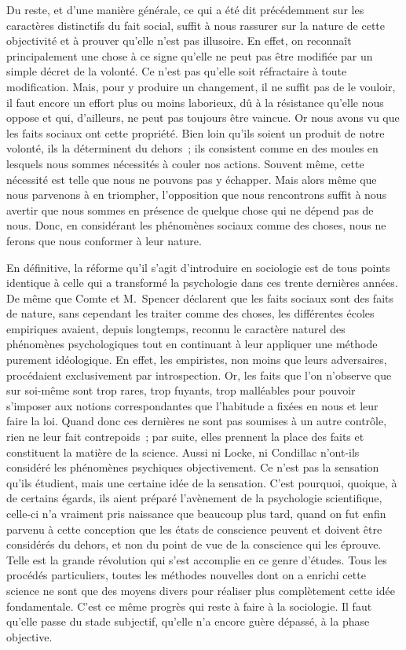 \documentclass[french,twoside]{book} %
\begin{document}
Du reste, et d’une manière générale, ce qui a été dit précédemment sur les caractères distinctifs du fait social, suffit à nous rassurer sur la nature de cette objectivité et à prouver qu’elle n’est pas illusoire. En effet, on reconnaît principalement une chose à ce signe qu’elle ne peut pas être modifiée par un simple décret de la volonté. Ce n’est pas qu’elle soit réfractaire à toute modification. Mais, pour y produire un changement, il ne suffit pas de le vouloir, il faut encore un effort plus ou moins laborieux, dû à la résistance qu’elle nous oppose et qui, d’ailleurs, ne peut pas toujours être vaincue. Or nous avons vu que les faits sociaux ont cette propriété. Bien loin qu’ils soient un produit de notre volonté, ils la déterminent du dehors ; ils consistent comme en des moules en lesquels nous sommes nécessités à couler nos actions. Souvent même, cette nécessité est telle que nous ne pouvons pas y échapper. Mais alors même que nous parvenons à en triompher, l’opposition que nous rencontrons suffit à nous avertir que nous sommes en présence de quelque chose qui ne dépend pas de nous. Donc, en considérant les phénomènes sociaux comme des choses, nous ne ferons que nous conformer à leur nature.\par
En définitive, la réforme qu’il s’agit d’introduire en sociologie est de tous points identique à celle qui a transformé la psychologie dans ces trente dernières années. De même que Comte et M. Spencer déclarent que les faits sociaux sont des faits de nature, sans cependant les traiter comme des choses, les différentes écoles empiriques avaient, depuis longtemps, reconnu le caractère naturel des phénomènes psychologiques tout en continuant à leur appliquer une méthode purement idéologique. En effet, les empiristes, non moins que leurs adversaires, procédaient exclusivement par introspection. Or, les faits que l’on n’observe que sur soi-même sont trop rares, trop fuyants, trop malléables pour pouvoir s’imposer aux notions correspondantes que l’habitude a fixées en nous et leur faire la loi. Quand donc ces dernières ne sont pas soumises à un autre contrôle, rien ne leur fait contrepoids ; par suite, elles prennent la place des faits et constituent la matière de la science. Aussi ni Locke, ni Condillac n’ont-ils considéré les phénomènes psychiques objectivement. Ce n’est pas la sensation qu’ils étudient, mais une certaine idée de la sensation. C’est pourquoi, quoique, à de certains égards, ils aient préparé l’avènement de la psychologie scientifique, celle-ci n’a vraiment pris naissance que beaucoup plus tard, quand on fut enfin parvenu à cette conception que les états de conscience peuvent et doivent être considérés du dehors, et non du point de vue de la conscience qui les éprouve. Telle est la grande révolution qui s’est accomplie en ce genre d’études. Tous les procédés particuliers, toutes les méthodes nouvelles dont on a enrichi cette science ne sont que des moyens divers pour réaliser plus complètement cette idée fondamentale. C’est ce même progrès qui reste à faire à la sociologie. Il faut qu’elle passe du stade subjectif, qu’elle n’a encore guère dépassé, à la phase objective.\par
\end{document}
